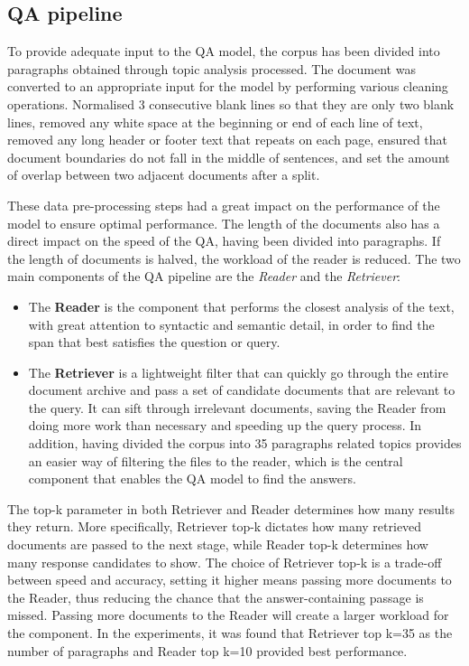\documentclass[runningheads]{llncs}
\begin{document}
\subsection{QA pipeline}
To provide adequate input to the QA model, the corpus has been divided into paragraphs obtained through topic analysis processed. The document was converted to an appropriate input for the model by performing various cleaning operations. Normalised 3 consecutive blank lines so that they are only two blank lines, removed any white space at the beginning or end of each line of text, removed any long header or footer text that repeats on each page, ensured that document boundaries do not fall in the middle of sentences, and set the amount of overlap between two adjacent documents after a split. 

These data pre-processing steps had a great impact on the performance of the model to ensure optimal performance. The length of the documents also has a direct impact on the speed of the QA, having been divided into paragraphs. If the length of documents is halved, the workload of the reader is reduced.
The two main components of the QA pipeline are the \textit{Reader} and the \textit{Retriever}:
\begin{itemize}
    \item The \textbf{Reader} is the component that performs the closest analysis of the text, with great attention to syntactic and semantic detail, in order to find the span that best satisfies the question or query\cite{c7}. 
    \item The \textbf{Retriever} is a lightweight filter that can quickly go through the entire document archive and pass a set of candidate documents that are relevant to the query. It can sift through irrelevant documents, saving the Reader from doing more work than necessary and speeding up the query process. In addition, having divided the corpus into 35 paragraphs related topics provides an easier way of filtering the files to the reader, which is the central component that enables the QA model to find the answers\cite{c7}.
\end{itemize}
The top-k parameter in both Retriever and Reader determines how many results they return. More specifically, Retriever top-k dictates how many retrieved documents are passed to the next stage, while Reader top-k determines how many response candidates to show.
The choice of Retriever top-k is a trade-off between speed and accuracy, setting it higher means passing more documents to the Reader, thus reducing the chance that the answer-containing passage is missed\cite{c7}. Passing more documents to the Reader will create a larger workload for the component. In the experiments, it was found that Retriever top k=35 as the number of paragraphs and Reader top k=10 provided best performance.
\end{document}
